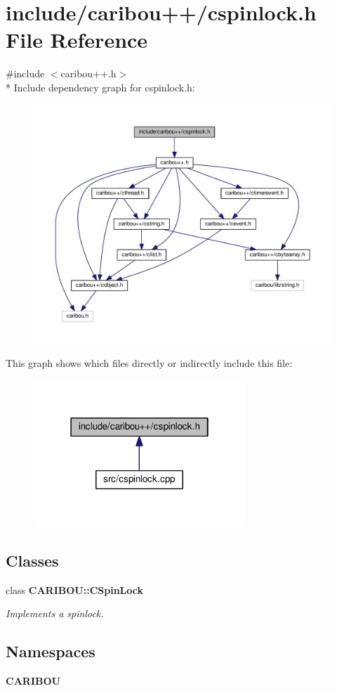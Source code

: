 \section{include/caribou++/cspinlock.h File Reference}
\label{cspinlock_8h}
{\ttfamily \#include $<$caribou++.\-h$>$}\\*
Include dependency graph for cspinlock.\-h\-:\nopagebreak
\begin{figure}[H]
\begin{center}
\leavevmode
\includegraphics[width=350pt]{cspinlock_8h__incl}
\end{center}
\end{figure}
This graph shows which files directly or indirectly include this file\-:\nopagebreak
\begin{figure}[H]
\begin{center}
\leavevmode
\includegraphics[width=226pt]{cspinlock_8h__dep__incl}
\end{center}
\end{figure}
\subsection*{Classes}
\begin{DoxyCompactItemize}
\item 
class {\bf C\-A\-R\-I\-B\-O\-U\-::\-C\-Spin\-Lock}
\begin{DoxyCompactList}\small\item\em Implements a spinlock. \end{DoxyCompactList}\end{DoxyCompactItemize}
\subsection*{Namespaces}
\begin{DoxyCompactItemize}
\item 
{\bf C\-A\-R\-I\-B\-O\-U}
\end{DoxyCompactItemize}
